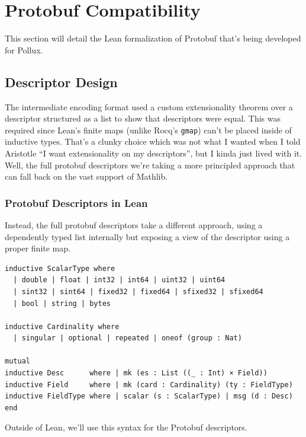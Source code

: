 \section{Protobuf Compatibility}\label{sec:proto-compat}

This section will detail the Lean formalization of Protobuf that's being
developed for Pollux.

\subsection{Descriptor Design}

The intermediate encoding format used a custom extensionality theorem over a
descriptor structured as a list to show that descriptors were equal. This was
required since Lean's finite maps (unlike Rocq's \texttt{gmap}) can't be placed
inside of inductive types. That's a clunky choice which was not what I wanted
when I told Aristotle ``I want extensionality on my descriptors'', but I kinda
just lived with it. Well, the full protobuf descriptors we're taking a more
principled approach that can fall back on the vast support of Mathlib.


\subsubsection{Protobuf Descriptors in Lean}

Instead, the full protobuf descriptors take a different approach, using a
dependently typed list internally but exposing a view of the descriptor using a
proper finite map.

\begin{verbatim}
inductive ScalarType where
  | double | float | int32 | int64 | uint32 | uint64
  | sint32 | sint64 | fixed32 | fixed64 | sfixed32 | sfixed64
  | bool | string | bytes

inductive Cardinality where
  | singular | optional | repeated | oneof (group : Nat)

mutual
inductive Desc      where | mk (es : List ((_ : Int) × Field))
inductive Field     where | mk (card : Cardinality) (ty : FieldType)
inductive FieldType where | scalar (s : ScalarType) | msg (d : Desc)
end
\end{verbatim}

Outside of Lean, we'll use this syntax for the Protobuf descriptors.

